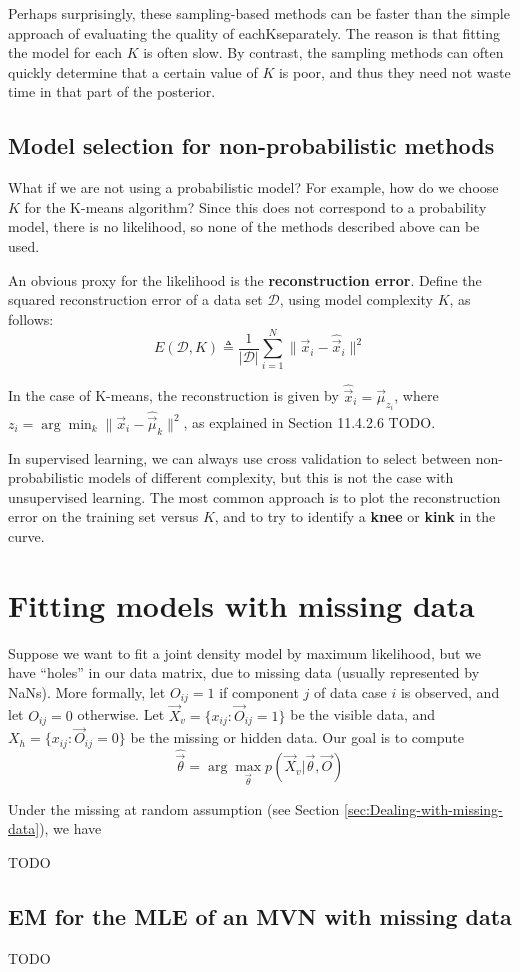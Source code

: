 Perhaps surprisingly, these sampling-based methods can be faster than the simple approach of evaluating the quality of eachKseparately. The reason is that fitting the model for each $K$ is often slow. By contrast, the sampling methods can often quickly determine that a certain value of $K$ is poor, and thus they need not waste time in that part of the posterior.


\subsection{Model selection for non-probabilistic methods}
What if we are not using a probabilistic model? For example, how do we choose $K$ for the K-means algorithm? Since this does not correspond to a probability model, there is no likelihood, so none of the methods described above can be used.

An obvious proxy for the likelihood is the \textbf{reconstruction error}. Define the squared reconstruction error of a data set $\mathcal{D}$, using model complexity $K$, as follows:
\begin{equation}
E(\mathcal{D}, K) \triangleq \frac{1}{|\mathcal{D}|}\sum\limits_{i=1}^N \lVert\vec{x}_i-\hat{\vec{x}}_i\rVert^2
\end{equation}

In the case of K-means, the reconstruction is given by $\hat{\vec{x}}_i=\vec{\mu}_{z_i}$, where $z_i=\arg\min_k \lVert\vec{x}_i-\hat{\vec{\mu}}_k\rVert^2$, as explained in Section 11.4.2.6 TODO.

In supervised learning, we can always use cross validation to select between non-probabilistic models of different complexity, but this is not the case with unsupervised learning. The most common approach is to plot the reconstruction error on the training set versus $K$, and to try to identify a \textbf{knee} or \textbf{kink} in the curve. 


\section{Fitting models with missing data}
Suppose we want to fit a joint density model by maximum likelihood, but we have “holes” in our data matrix, due to missing data (usually represented by NaNs). More formally, let $O_{ij} =1$ if component $j$ of data case $i$ is observed, and let $O_{ij} =0$ otherwise. Let $\vec{X}_v=\{x_{ij}: \vec{O}_{ij} =1\}$ be the visible data, and $X_h=\{x_{ij}: \vec{O}_{ij} =0\}$ be the missing or hidden data. Our goal is to compute
\begin{equation}
\hat{\vec{\theta}}=\arg\max_{\vec{\theta}} p(\vec{X}_v|\vec{\theta}, \vec{O})
\end{equation}

Under the missing at random assumption (see Section \ref{sec:Dealing-with-missing-data}), we have

TODO

\subsection{EM for the MLE of an MVN with missing data}
TODO
